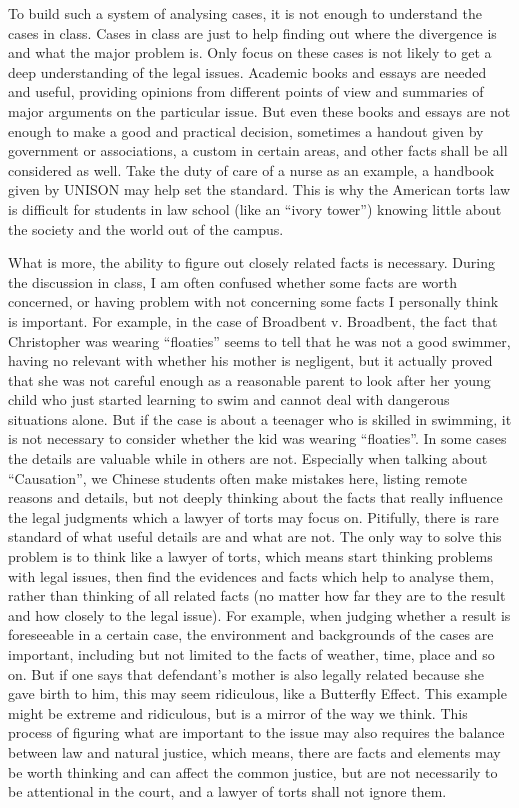 \documentclass[10pt,a4paper]{ctexart}
\begin{document}
To build such a system of analysing cases, it is not enough to understand the cases in class. Cases in class are just to help finding out where the divergence is and what the major problem is. Only focus on these cases is not likely to get a deep understanding of the legal issues. Academic books and essays are needed and useful, providing opinions from different points of view and summaries of major arguments on the particular issue. But even these books and essays are not enough to make a good and practical decision, sometimes a handout given by government or associations, a custom in certain areas, and other facts shall be all considered as well. Take the duty of care of a nurse as an example, a handbook given by UNISON may help set the standard. This is why the American torts law is difficult for students in law school (like an “ivory tower”) knowing little about the society and the world out of the campus. 

What is more, the ability to figure out closely related facts is necessary. During the discussion in class, I am often confused whether some facts are worth concerned, or having problem with not concerning some facts I personally think is important. For example, in the case of Broadbent v. Broadbent, the fact that Christopher was wearing “floaties” seems to tell that he was not a good swimmer, having no relevant with whether his mother is negligent, but it actually proved that she was not careful enough as a reasonable parent to look after her young child who just started learning to swim and cannot deal with dangerous situations alone. But if the case is about a teenager who is skilled in swimming, it is not necessary to consider whether the kid was wearing “floaties”. In some cases the details are valuable while in others are not. Especially when talking about “Causation”, we Chinese students often make mistakes here, listing remote reasons and details, but not deeply thinking about the facts that really influence the legal judgments which a lawyer of torts may focus on. Pitifully, there is rare standard of what useful details are and what are not. The only way to solve this problem is to think like a lawyer of torts, which means start thinking problems with legal issues, then find the evidences and facts which help to analyse them, rather than thinking of all related facts (no matter how far they are to the result and how closely to the legal issue). For example, when judging whether a result is foreseeable in a certain case, the environment and backgrounds of the cases are important, including but not limited to the facts of weather, time, place and so on. But if one says that defendant’s mother is also legally related because she gave birth to him, this may seem ridiculous, like a Butterfly Effect. This example might be extreme and ridiculous, but is a mirror of the way we think. This process of figuring what are important to the issue may also requires the balance between law and natural justice, which means, there are facts and elements may be worth thinking and can affect the common justice, but are not necessarily to be attentional in the court, and a lawyer of torts shall not ignore them. 
\end{document}
